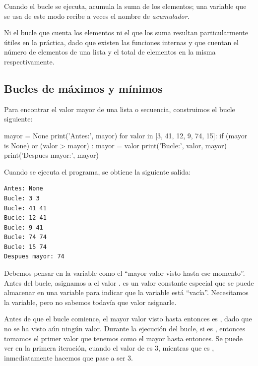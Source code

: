 Cuando el bucle se ejecuta,  acumula la suma de los
elementos; una variable que se usa de este modo recibe a veces el nombre
de \emph{acumulador}.


Ni el bucle que cuenta los elementos ni el que los suma resultan
particularmente útiles en la práctica, dado que existen las funciones
internas  y  que cuentan el número de
elementos de una lista y el total de elementos en la misma
respectivamente.

\hypertarget{bucles-de-muxe1ximos-y-muxednimos}{%
\subsection{Bucles de máximos y
mínimos}\label{bucles-de-muxe1ximos-y-muxednimos}}

  

Para encontrar el valor mayor de una lista o secuencia, construimos el
bucle siguiente:

\begin{python}[frame=single]
mayor = None
print('Antes:', mayor)
for valor in [3, 41, 12, 9, 74, 15]:
    if (mayor is None) or (valor > mayor) :
        mayor = valor
    print('Bucle:', valor, mayor)
print('Despues mayor:', mayor)
\end{python}

Cuando se ejecuta el programa, se obtiene la siguiente salida:

\begin{Verbatim}[frame=single]
Antes: None
Bucle: 3 3
Bucle: 41 41
Bucle: 12 41
Bucle: 9 41
Bucle: 74 74
Bucle: 15 74
Despues mayor: 74
\end{Verbatim}

Debemos pensar en la variable  como el ``mayor valor visto
hasta ese momento''. Antes del bucle, asignamos a  el
valor .  es un valor constante especial que se
puede almacenar en una variable para indicar que la variable está
``vacía''. Necesitamos la variable, pero no sabemos todavía que valor asignarle.

Antes de que el bucle comience, el mayor valor visto hasta entonces es
, dado que no se ha visto aún ningún valor. Durante la
ejecución del bucle, si  es , entonces
tomamos el primer valor que tenemos como el mayor hasta entonces. Se
puede ver en la primera iteración, cuando el valor de  es
3, mientras que  es , inmediatamente hacemos
que  pase a ser 3.

